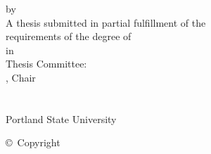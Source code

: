 \begin{center}
\hfill \break
\hfill \break
by \\
\hfill \break
\hfill \break
\hfill \break
A thesis submitted in partial fulfillment of the \\
requirements of the degree of \\
\hfill \break
\hfill \break
in \\
\hfill \break
\hfill \break
\hfill \break
Thesis Committee: \\
, Chair \\
\\
\\
\hfill \break
\hfill \break
Portland State University \\


\end{center}

\clearpage

\begin{center}
\copyright~Copyright %
{%
}
\end{center}
\clearpage

